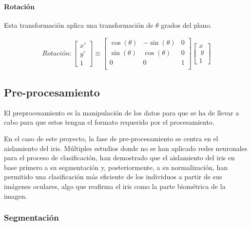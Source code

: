 \paragraph{Rotación}

Esta transformación aplica una transformación de $\theta$ grados del plano.



\begin{gather}
	Rotación:
	\begin{bmatrix} x' \\ y' \\ 1 \end{bmatrix}
	\equiv
	 \begin{bmatrix}
	  \cos(\theta) &-\sin(\theta) & 0 \\
	  \sin(\theta) & \cos(\theta) & 0 \\
	  0 & 0 & 1 \\
	  \end{bmatrix}
	  \begin{bmatrix} x \\\ y \\ 1 \end{bmatrix}
\end{gather}


\subsection{Pre-procesamiento} \label{preprocesamiento}

El preprocesamiento es la manipulación de los datos para que se ha de llevar a cabo para que estos tengan el formato requerido por el procesamiento.

En el caso de este proyecto, la fase de pre-procesamiento se centra en el aislamiento del iris. Múltiples estudios \cite{tfg_iris_2020} \cite{abdullah_iris_2015} \cite{malgheet_iris_2021} \cite{dd_post-mortem_2020} \cite{liu_efficient_2021} \cite{szymkowski_iris-based_2021} \cite{lozej_end--end_2018} donde no se han aplicado redes neuronales para el proceso de clasificación, han demostrado 
que el aislamiento del iris en base primero a su segmentación y, posteriormente, a su normalización, han permitido una clasificación más eficiente de los individuos a partir de sus imágenes oculares, algo que reafirma el iris como la parte biométrica de la imagen.

\subsubsection{Segmentación} \label{subsubsec:segmentacion}


